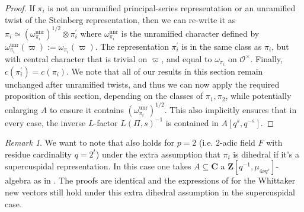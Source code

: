 \documentclass{amsart}
\theoremstyle{plain}
\theoremstyle{plain}
\theoremstyle{remark}
\newtheorem{rem}[thm]{Remark}
\begin{document}
\begin{proof}
    If $\pi_i$ is not an unramified principal-series representation or an unramified twist of the Steinberg representation, then we can re-write it as  $\pi_i\simeq (\omega_{\pi_i}^\mathrm{unr})^{1/2}\otimes \pi_i^{'}$ where $\omega_{\pi_i}^\mathrm{unr}$ is the unramified character defined by $\omega_{\pi_i}^\mathrm{unr}(\varpi):=\omega_{\pi_i}(\varpi)$. The representation $\pi_i^{'}$ is in the same class as $\pi_i$, but with central character that is trivial on $\varpi$, and equal to $\omega_{\pi_i}$ on $\mathcal{O}^\times$. Finally, $c(\pi_i^{'})=c(\pi_i)$. We note that all of our results in this section remain unchanged after unramified twists, and thus we can now apply the required proposition of this section, depending on the classes of $\pi_1,\pi_2$, while potentially enlarging $A$ to ensure it contains $(\omega_{\pi_i}^\mathrm{unr})^{1/2}$. This also implicitly ensures that in every case, the inverse $L$-factor $L(\Pi,s)^{-1}$ is contained in $A[q^s,q^{-s}]$.
\end{proof}

\begin{rem}\label{rem p=2}
    We want to note that  also holds for $p=2$ (i.e. $2$-adic field $F$ with residue cardinality $q=2^t$) under the extra assumption that $\pi_i$ is dihedral if it's a supercuspidal representation. In this case one takes $A\subseteq \mathbf{C}$ a $\mathbf{Z}[q^{-1},\mu_{4\nu q^\tau}]$-algebra as in . The proofs are identical and the expressions of \cite{Assing_2018} for the Whittaker new vectors still hold under this extra dihedral assumption in the supercuspidal case.
\end{rem}
\end{document}
